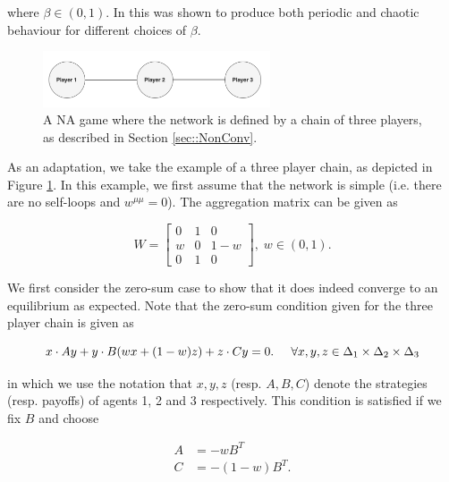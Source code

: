 \documentclass{article}
\theoremstyle{definition}
\begin{document}
  where $\beta \in (0, 1)$. In \cite{} this was shown to produce both periodic and chaotic behaviour for different choices of $\beta$. 

  \begin{figure}[t]
    \centering
    \includegraphics[width = 0.6\textwidth]{Figures/ThreePlayerNetwork.png}
    \caption{\label{fig::ThreePlayerNetwork} A NA game where the network is defined by a chain of
    three players, as described in Section \ref{sec::NonConv}.}
  \end{figure}

  As an adaptation, we take the example of a three player chain, as depicted in Figure \ref{fig::ThreePlayerNetwork}. In this example, we first assume that the network is simple (i.e. there are no self-loops and $w^{\mu \mu} = 0$). The aggregation matrix can be given as

  \begin{equation}
    W = \begin{bmatrix}
      0 & 1 & 0 \\
      w & 0 & 1 - w \\
      0 & 1 & 0
    \end{bmatrix}, \; w \in (0, 1).
  \end{equation}


  We first consider the zero-sum case to show that it does indeed converge to an equilibrium as expected. Note that the zero-sum condition given for the three player chain is given as

  \begin{equation}
    x \cdot A y + y \cdot B (w x + (1-w)z) + z \cdot C y = 0. \hspace{0.5cm} \forall x, y, z \in \Delta_1 \times \Delta_2 \times \Delta_3
  \end{equation}

  in which we use the notation that $x, y, z$ (resp. $A, B, C$) denote the strategies (resp. payoffs) of agents 1, 2 and 3 respectively. This condition is satisfied if we fix $B$ and choose

  \begin{align} \label{eq::zeroSumShapley}
    A & = - w B^T \nonumber \\
    C & = - (1 - w) B^T. 
  \end{align}
\end{document}
